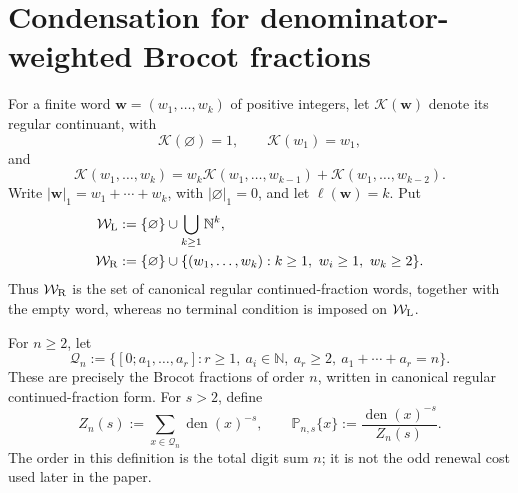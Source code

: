 \section{Condensation for denominator-weighted Brocot fractions}
\label{sec:brocot-condensation}

For a finite word \(\mathbf w=(w_1,\ldots,w_k)\) of positive integers,
let \(\mathcal K(\mathbf w)\) denote its regular continuant, with
\[
 \mathcal K(\varnothing)=1,\qquad
 \mathcal K(w_1)=w_1,
\]
and
\[
 \mathcal K(w_1,\ldots,w_k)
 =w_k\mathcal K(w_1,\ldots,w_{k-1})
  +\mathcal K(w_1,\ldots,w_{k-2}).
\]
Write \(|\mathbf w|_1=w_1+\cdots+w_k\), with
\(|\varnothing|_1=0\), and let \(\ell(\mathbf w)=k\).  Put
\[
 \begin{aligned}
  \mathcal W_{\rm L}&:=\{\varnothing\}\cup
    \bigcup_{k\ge1}\mathbb N^k,\\
  \mathcal W_{\rm R}&:=\{\varnothing\}\cup
    \{(w_1,\ldots,w_k):k\ge1,\ w_i\ge1,\ w_k\ge2\}.
 \end{aligned}
\]
Thus \(\mathcal W_{\rm R}\) is the set of canonical regular
continued-fraction words, together with the empty word, whereas no terminal
condition is imposed on \(\mathcal W_{\rm L}\).

For \(n\ge2\), let
\[
 \mathcal Q_n:=
 \{[0;a_1,\ldots,a_r]:r\ge1,\ a_i\in\mathbb N,\ a_r\ge2,
                         \ a_1+\cdots+a_r=n\}.
\]
These are precisely the Brocot fractions of order \(n\), written in
canonical regular continued-fraction form.  For \(s>2\), define
\begin{equation}
 Z_n(s):=\sum_{x\in\mathcal Q_n}\operatorname{den}(x)^{-s},
 \qquad
 \mathbb P_{n,s}\{x\}:=\frac{\operatorname{den}(x)^{-s}}{Z_n(s)}.
 \label{eq:brocot-probability}
\end{equation}
The order in this definition is the total digit sum \(n\); it is not the
odd renewal cost used later in the paper.

